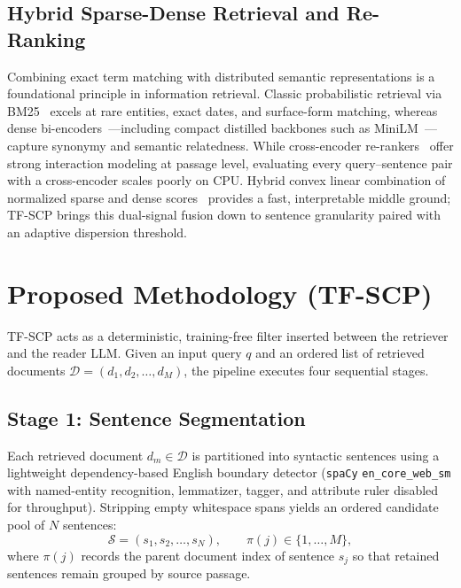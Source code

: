 \documentclass[conference]{IEEEtran}
\begin{document}
\subsection{Hybrid Sparse-Dense Retrieval and Re-Ranking}
Combining exact term matching with distributed semantic representations is a foundational principle in information retrieval. Classic probabilistic retrieval via BM25~\cite{robertson2009bm25} excels at rare entities, exact dates, and surface-form matching, whereas dense bi-encoders~\cite{reimers2019sbert}---including compact distilled backbones such as MiniLM~\cite{wang2020minilm}---capture synonymy and semantic relatedness. While cross-encoder re-rankers~\cite{nogueira2019passage} offer strong interaction modeling at passage level, evaluating every query--sentence pair with a cross-encoder scales poorly on CPU. Hybrid convex linear combination of normalized sparse and dense scores~\cite{ma2021replication,cormack2009rrf} provides a fast, interpretable middle ground; TF-SCP brings this dual-signal fusion down to sentence granularity paired with an adaptive dispersion threshold.

\section{Proposed Methodology (TF-SCP)}

TF-SCP acts as a deterministic, training-free filter inserted between the retriever and the reader LLM. Given an input query $q$ and an ordered list of retrieved documents $\mathcal{D} = (d_1, d_2, \dots, d_M)$, the pipeline executes four sequential stages.

\subsection{Stage 1: Sentence Segmentation}
Each retrieved document $d_m \in \mathcal{D}$ is partitioned into syntactic sentences using a lightweight dependency-based English boundary detector (\texttt{spaCy} \texttt{en\_core\_web\_sm} with named-entity recognition, lemmatizer, tagger, and attribute ruler disabled for throughput). Stripping empty whitespace spans yields an ordered candidate pool of $N$ sentences:
\begin{equation}
\mathcal{S} = (s_1, s_2, \dots, s_N), \qquad \pi(j) \in \{1, \dots, M\},
\end{equation}
where $\pi(j)$ records the parent document index of sentence $s_j$ so that retained sentences remain grouped by source passage.
\end{document}
